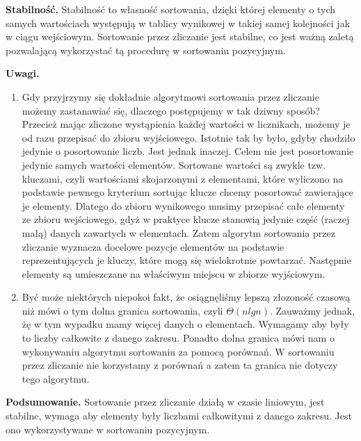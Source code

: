 \textbf{Stabilność.} 
Stabilność to własność sortowania, dzięki której elementy o tych samych wartościach występują w tablicy wynikowej w takiej samej kolejności jak w ciągu wejściowym.
Sortowanie przez zliczanie jest stabilne, co jest ważną zaletą pozwalającą wykorzystać tą procedurę w sortowaniu pozycyjnym.

\textbf{Uwagi.} 
\begin{enumerate}
\item Gdy przyjrzymy się dokładnie algorytmowi sortowania przez zliczanie możemy zastanawiać się, dlaczego postępujemy w tak dziwny sposób?
Przecież mając zliczone wystąpienia każdej wartości w licznikach, możemy je od razu przepisać do zbioru wyjściowego.
Istotnie tak by było, gdyby chodziło jedynie o posortowanie liczb. Jest jednak inaczej.
Celem nie jest posortowanie jedynie samych wartości elementów.
Sortowane wartości są zwykle tzw. kluczami, czyli wartościami skojarzonymi z elementami, które wyliczono na podstawie pewnego kryterium sortując klucze chcemy posortować zawierające je elementy.
Dlatego do zbioru wynikowego musimy przepisać całe elementy ze zbioru wejściowego, gdyż w praktyce klucze stanowią jedynie część (raczej małą) danych zawartych w elementach.
Zatem algorytm sortowania przez zliczanie wyznacza docelowe pozycje elementów na podstawie reprezentujących je kluczy, które mogą się wielokrotnie powtarzać.
Następnie elementy są umieszczane na właściwym miejscu w zbiorze wyjściowym.

\item Być może niektórych niepokoi fakt, że osiągnęliśmy lepszą złozoność czasową niż mówi o tym dolna granica sortowania, czyli $\Theta(n lg n)$.
Zauważmy jednak, żę w tym wypadku mamy więcej danych o elementach.
Wymagamy aby były to liczby całkowite z danego zakresu.
Ponadto dolna granica mówi nam o wykonywaniu algorytmu sortowaniu za pomocą porównań.
W sortowaniu przez zliczanie nie korzystamy z porównań a zatem ta granica nie dotyczy tego algorytmu.
\end{enumerate}

\textbf{Podsumowanie.} 
Sortowanie przez zliczanie działą w czasie liniowym, jest stabilne, wymaga aby elementy były liczbami całkowitymi z danego zakresu.
Jest ono wykorzystywane w sortowaniu pozycyjnym.
